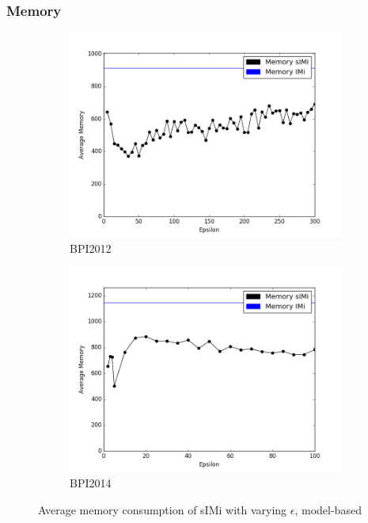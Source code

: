 \documentclass[
	a4paper,
	pagesize,
	pdftex,
	12pt,
	twoside, %
	BCOR=5mm, %
	ngerman,
	fleqn,
	final,
	]{scrartcl}
\begin{document}
\subsubsection{Memory}
\begin{figure}[h]
	\begin{subfigure}{.5\textwidth}
	  \centering
	  \includegraphics[width=.9\linewidth]{data/BPI2012/BPI_2012_lax_threshold_memory.png}
	  \caption{BPI2012}
	  \label{fig:mem12}
	\end{subfigure}%
	\begin{subfigure}{.5\textwidth}
	  \centering
	  \includegraphics[width=.9\linewidth]{data/BPI2014/BPI2014_lax_threshold_memory.png}
	  \caption{BPI2014}
	  \label{fig:mem14}
	\end{subfigure}
	\caption{Average memory consumption of sIMi with varying $\epsilon$, model-based}
	\label{fig:mem1214}
\end{figure}
\end{document}
